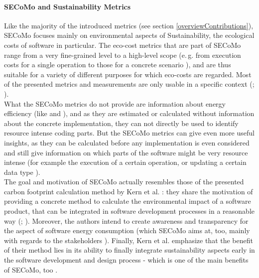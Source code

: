 \documentclass[oribibl]{llncs}
\begin{document}
\paragraph{SECoMo and Sustainability Metrics}
Like the majority of the introduced metrics (see section \ref{overviewContributions}), SECoMo focuses mainly on environmental aspects of Sustainability, the ecological costs of software in particular. The eco-cost metrics that are part of SECoMo range from a very fine-grained level to a high-level scope (e.\,g. from execution costs for a single operation to those for a concrete scenario \cite{schulze_cost_2016}), and are thus suitable for a variety of different purposes for which eco-costs are regarded. Most of the presented metrics and measurements are only usable in a specific context (\cite{naumann_how_2008}; \cite{capra_is_2012}).\\ %
What the SECoMo metrics do not provide are information about energy efficiency (like \cite{capra_is_2012} and \cite{johann_how_2012}), and as they are estimated or calculated without information about the concrete implementation, they can not directly be used to identify resource intense coding parts. But the SECoMo metrics can give even more useful insights, as they can be calculated before any implementation is even considered and still give information on which parts of the software might be very resource intense (for example the execution of a certain operation, or updating a certain data type \cite{schulze_cost_2016}).\\
The goal and motivation of SECoMo actually resembles those of the presented carbon footprint calculation method by Kern et al. \cite{kern_impacts_2015}: they share the motivation of providing a concrete method to calculate the environmental impact of a software product, that can be integrated in software development processes in a reasonable way %
(\cite{kern_impacts_2015}; \cite{schulze_cost_2016}). Moreover, the authors intend to create awareness and transparency for the aspect of software energy consumption \cite{kern_impacts_2015} (which SECoMo aims at, too, mainly with regards to the stakeholders \cite{schulze_cost_2016}). Finally, Kern et al. emphasize that the benefit of their method lies in its ability to finally integrate sustainability aspects early in the software development and design process %
\cite{kern_impacts_2015} - which is one of the main benefits of SECoMo, too \cite{schulze_cost_2016}.\\ %
\end{document}
